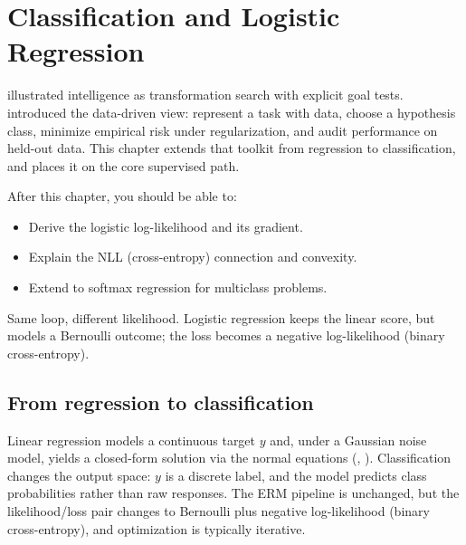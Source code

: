 \section{Classification and Logistic Regression}\label{chap:logistic}
 illustrated intelligence as transformation search with explicit goal tests.  introduced the data\hyp{}driven view: represent a task with data, choose a hypothesis class, minimize empirical risk under regularization, and audit performance on held\hyp{}out data. This chapter extends that toolkit from regression to classification, and  places it on the core supervised path.

\begin{tcolorbox}[summarybox, title={Learning Outcomes}]
After this chapter, you should be able to:
\begin{itemize}
  \item Derive the logistic log\hyp{}likelihood and its gradient.
  \item Explain the NLL (cross\hyp{}entropy) connection and convexity.
  \item Extend to softmax regression for multiclass problems.
\end{itemize}
\end{tcolorbox}

\begin{tcolorbox}[summarybox, title={Design motif}]
Same loop, different likelihood. Logistic regression keeps the linear score, but models a Bernoulli outcome; the loss becomes a negative log\hyp{}likelihood (binary cross\hyp{}entropy).
\end{tcolorbox}

\subsection{From regression to classification}
\label{sec:logistic_from_regression_to_classification}
Linear regression models a continuous target \(y\) and, under a Gaussian noise model, yields a closed-form solution via the normal equations (, ). Classification changes the output space: \(y\) is a discrete label, and the model predicts class probabilities rather than raw responses. The ERM pipeline is unchanged, but the likelihood/loss pair changes to Bernoulli plus negative log-likelihood (binary cross\hyp{}entropy), and optimization is typically iterative.

